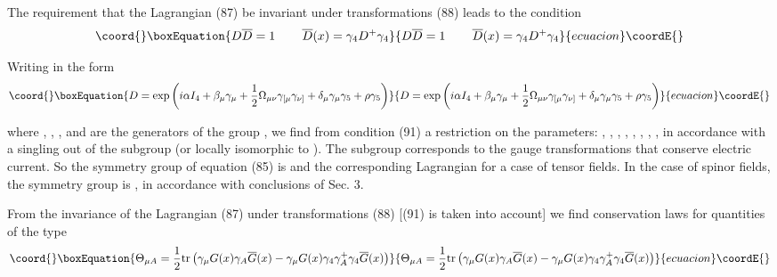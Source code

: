 \documentclass[a4paper,12pt]{article}
\begin{document}
The requirement that the Lagrangian (87) be invariant under transformations
(88) leads to the condition
\begin{equation}\coord{}\boxEquation{
D\overline{D}=1\hspace{0.3in}\overline{D}(x)=\gamma _4D^{+}\gamma _4
\label{91}
}{
D\overline{D}=1\hspace{0.3in}\overline{D}(x)=\gamma _4D^{+}\gamma _4
}{ecuacion}\coordE{}\end{equation}

Writing \coordHE{} in the form
\begin{equation}\coord{}\boxEquation{
D=\exp \left( i\alpha I_4+\beta _\mu \gamma _\mu +\frac 12\Omega _{\mu \nu
}\gamma _{[\mu }\gamma _{\nu ]}+\delta _\mu \gamma _\mu \gamma _5+\rho
\gamma _5\right)  \label{92}
}{
D=\exp \left( i\alpha I_4+\beta _\mu \gamma _\mu +\frac 12\Omega _{\mu \nu
}\gamma _{[\mu }\gamma _{\nu ]}+\delta _\mu \gamma _\mu \gamma _5+\rho
\gamma _5\right)  }{ecuacion}\coordE{}\end{equation}

where \coordHE{}, \myHighlight{$\gamma _\mu $}\coordHE{}, \myHighlight{$\frac 12\gamma _{[\mu }\gamma _{\nu
]}$}\coordHE{}, \coordHE{} and \coordHE{} are the generators
of the group \coordHE{}, we find from condition (91) a restriction
on the parameters: \myHighlight{$ \alpha ^{*}=\alpha $}\coordHE{}, \coordHE{}, \coordHE{}, \coordHE{},
\coordHE{}, \coordHE{},
\coordHE{}, \myHighlight{$\rho ^{*}=\rho $}\coordHE{}, in accordance with
a singling out of the \coordHE{} subgroup (or locally
isomorphic to \coordHE{}). The subgroup \coordHE{} corresponds to the
gauge transformations that conserve electric current. So the
symmetry group of equation (85) is \coordHE{} and the corresponding
Lagrangian \myHighlight{$-$}\coordHE{}  \coordHE{} for a case of tensor fields.
In the case of spinor fields, the symmetry group is \coordHE{}, in
accordance with conclusions of Sec. 3.

From the invariance of the Lagrangian (87) under transformations (88) [(91)
is taken into account] we find conservation laws for quantities of the type
\begin{equation}\coord{}\boxEquation{
\Theta _{\mu A}=\frac 12\mbox{tr}\left( \gamma _\mu G(x)\gamma
_A\overline{G} (x)-\gamma _\mu G(x)\gamma _4\gamma _A^{+}\gamma
_4\overline{G}(x)\right) \label{93}
}{
\Theta _{\mu A}=\frac 12\mbox{tr}\left( \gamma _\mu G(x)\gamma
_A\overline{G} (x)-\gamma _\mu G(x)\gamma _4\gamma _A^{+}\gamma
_4\overline{G}(x)\right) }{ecuacion}\coordE{}\end{equation}
\end{document}
